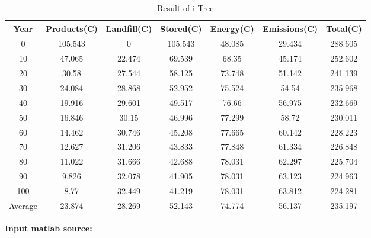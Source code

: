 \documentclass{mcmthesis}
\numberwithin{figure}{section}
\numberwithin{table}{section}
\numberwithin{equation}{section}
\begin{document}
\begin{appendices}
\begin{table}[ht]
  \caption{Result of i-Tree}\label{iTree}
  \begin{tabular}{
  >{\columncolor[HTML]{FFFFFF}}c |
  >{\columncolor[HTML]{FFFFFF}}c 
  >{\columncolor[HTML]{FFFFFF}}c 
  >{\columncolor[HTML]{FFFFFF}}c 
  >{\columncolor[HTML]{FFFFFF}}c 
  >{\columncolor[HTML]{FFFFFF}}c 
  >{\columncolor[HTML]{FFFFFF}}c }
  \textbf{Year} & \textbf{Products(C)} & \textbf{Landfill(C)} & \textbf{Stored(C)} & \textbf{Energy(C)} & \textbf{Emissions(C)} & \textbf{Total(C)} \\ \hline
  0       & 105.543 & 0      & 105.543 & 48.085 & 29.434 & 288.605 \\
  10      & 47.065  & 22.474 & 69.539  & 68.35  & 45.174 & 252.602 \\
  20      & 30.58   & 27.544 & 58.125  & 73.748 & 51.142 & 241.139 \\
  30      & 24.084  & 28.868 & 52.952  & 75.524 & 54.54  & 235.968 \\
  40      & 19.916  & 29.601 & 49.517  & 76.66  & 56.975 & 232.669 \\
  50      & 16.846  & 30.15  & 46.996  & 77.299 & 58.72  & 230.011 \\
  60      & 14.462  & 30.746 & 45.208  & 77.665 & 60.142 & 228.223 \\
  70      & 12.627  & 31.206 & 43.833  & 77.848 & 61.334 & 226.848 \\
  80      & 11.022  & 31.666 & 42.688  & 78.031 & 62.297 & 225.704 \\
  90      & 9.826   & 32.078 & 41.905  & 78.031 & 63.123 & 224.963 \\
  100     & 8.77    & 32.449 & 41.219  & 78.031 & 63.812 & 224.281 \\
  Average & 23.874  & 28.269 & 52.143  & 74.774 & 56.137 & 235.197
  \end{tabular}
  \end{table}

\textbf{\textcolor[rgb]{0.98,0.00,0.00}{Input matlab source:}}


\end{appendices}
\end{document}
